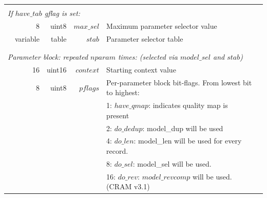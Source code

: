 \documentclass[a4paper]{article}
\begin{document}
\begin{table}
\begin{tabular}{|r|r|r|r|r|p{8cm}|l|l|}
\multicolumn{8}{|l|}{}\\[-0.5em]
\multicolumn{8}{|l|}{\textit{If $have\_tab$ gflag is set:} }                                                                                                                                 \\ 
\cline{2-7}
                       & \multicolumn{2}{r|}{8}        & uint8          & $max\_sel$                     & \multicolumn{2}{p{8.4cm}|}{Maximum parameter selector value} & \\
                       & \multicolumn{2}{r|}{variable} & table          & $stab$                         & \multicolumn{2}{p{8.4cm}|}{Parameter selector table} & \\
\cline{2-7}
\multicolumn{8}{|l|}{}\\
\hline
\hline
\multicolumn{8}{|l|}{}\\[-0.7em]
\multicolumn{8}{|l|}{\textit{Parameter block: repeated $nparam$ times: (selected via $model\_sel$ and $stab$)}} \\ 
\cline{2-7}
                       & \multicolumn{2}{r|}{16}        & uint16        & $context$                      & \multicolumn{2}{p{8.4cm}|}{Starting context value} & \\
\cline{2-7}
                       & \multicolumn{2}{r|}{8}        & uint8          & $pflags$                       & \multicolumn{2}{p{8.4cm}|}{Per-parameter block bit-flags. From lowest bit to highest:} & \\
                       & \multicolumn{2}{r|}{}         &                &                                & \multicolumn{2}{p{8.4cm}|}{1: $have\_qmap$: indicates quality map is present} & \\
                       & \multicolumn{2}{r|}{}         &                &                                & \multicolumn{2}{p{8.4cm}|}{2: $do\_dedup$: model\_dup will be used} & \\
                       & \multicolumn{2}{r|}{}         &                &                                & \multicolumn{2}{p{8.4cm}|}{4: $do\_len$: model\_len will be used for every record.} & \\
                       & \multicolumn{2}{r|}{}         &                &                                & \multicolumn{2}{p{8.4cm}|}{8: $do\_sel$: model\_sel will be used.} & \\
                       & \multicolumn{2}{r|}{}         &                &                                & \multicolumn{2}{p{8.4cm}|}{16: $do\_rev$: $model\_revcomp$ will be used. (CRAM v3.1)} & \\

\end{tabular}
\end{table}
\end{document}
